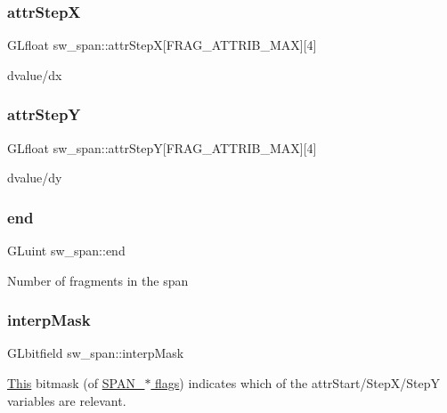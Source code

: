 \subsubsection{\texorpdfstring{attr\+StepX}{attrStepX}}
{\footnotesize\ttfamily G\+Lfloat sw\+\_\+span\+::attr\+StepX\mbox{[}F\+R\+A\+G\+\_\+\+A\+T\+T\+R\+I\+B\+\_\+\+M\+AX\mbox{]}\mbox{[}4\mbox{]}}

dvalue/dx \mbox{\label{structsw__span_acf5f0b969e0de41f4d9c000704c3629b}} 
\subsubsection{\texorpdfstring{attr\+StepY}{attrStepY}}
{\footnotesize\ttfamily G\+Lfloat sw\+\_\+span\+::attr\+StepY\mbox{[}F\+R\+A\+G\+\_\+\+A\+T\+T\+R\+I\+B\+\_\+\+M\+AX\mbox{]}\mbox{[}4\mbox{]}}

dvalue/dy \mbox{\label{structsw__span_a8762d6f687eccea08a9392ce7300f725}} 
\subsubsection{\texorpdfstring{end}{end}}
{\footnotesize\ttfamily G\+Luint sw\+\_\+span\+::end}

Number of fragments in the span \mbox{\label{structsw__span_ab88b4f60858ee7370048120ae672b488}} 
\subsubsection{\texorpdfstring{interp\+Mask}{interpMask}}
{\footnotesize\ttfamily G\+Lbitfield sw\+\_\+span\+::interp\+Mask}

\hyperlink{namespace_this}{This} bitmask (of \hyperlink{group___span_flags}{S\+P\+A\+N\+\_\+$\ast$ flags}) indicates which of the attr\+Start/\+Step\+X/\+StepY variables are relevant. \mbox{\label{structsw__span_a213d92f376d6440a18d29117b89b18f3}} 
